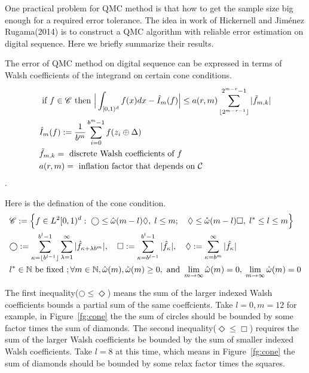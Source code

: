 

One practical problem for QMC method is that how to get the sample size big enough for a required error tolerance. The idea in work of Hickernell and Jiménez Rugama(2014)\cite{hickernell2014reliable} is to construct a QMC algorithm with reliable error estimation on digital sequence. Here we briefly summarize their results.

The error of QMC method on digital sequence can be expressed in terms of Walsh coefficients of the integrand on certain cone conditions. 
\begin{align}
    \label{eq:errBound}
    &\text{ if } f \in \mathscr{C}\text{ then } \Big|\int_{[0,1)^d}f(x)dx - \hat{I}_m(f)\Big| \leq a(r,m) \sum_{\lfloor 2^{m-r-1} \rfloor}^{2^{m-r}-1} |\tilde{f}_{m,k}|\\
    &\hat{I}_m(f): = \frac{1}{b^m}\sum_{i=0}^{b^m-1}f(z_i\oplus \Delta)\notag\\
    &\tilde{f}_{m,k}=\text{ discrete Walsh coefficients of }f \notag\\
    &a(r,m) =\text{ inflation factor that depends on } \mathcal{C} \notag
\end{align}.

Here is the defination of the cone condition.
\begin{align}
   &\mathscr{C}:=\Big\{f\in L^2[0,1)^d:\;\bigcirc \leq \hat{\omega}(m-l)\Diamond,\; l\leq m;\quad
   \Diamond \leq \mathring{\omega}(m-l) \Box, 
   \; l^*\leq l \leq m\Big\}\notag\\
   \label{eq:cone}
   &\bigcirc:= \sum_{\kappa=\lfloor b^{l-1} \rfloor}^{b^l-1} \sum_{\lambda=1}^{\infty}| \hat{f}_{\kappa+\lambda b^m}|,\quad  
   \Box:= \sum_{\kappa=b^{l-1}}^{b^l-1}|\hat{f}_\kappa|,\quad
   \Diamond:=\sum_{\kappa=b^m}^{\infty}|\hat{f}_{\kappa}|\\
   &l^*\in \mathbb{N}\text{ be fixed }; \forall m\in \mathbb{N},\hat{\omega}(m),\mathring{\omega}(m)\geq 0, \text{ and } \lim_{m\to \infty} \hat{\omega}(m)=0,\; \lim_{m\to \infty} \mathring{\omega}(m)=0\notag
\end{align}

The first inequality($\bigcirc \leq \Diamond$) means the sum of the larger indexed Walsh coefficients bounds a partial sum of the same coeffcients. 
Take $l=0, m=12$ for example, in Figure~\ref{fg:cone} the the sum of circles should be bounded by some factor times the sum of diamonds. The second inequality($\Diamond\leq \Box$) requires the sum of the larger Walsh coefficients be bounded by the sum of smaller indexed Walsh coefficients. 
Take $l=8$ at this time, which means in Figure~\ref{fg:cone} the sum of diamonds should be bounded by some relax factor times the squares.


